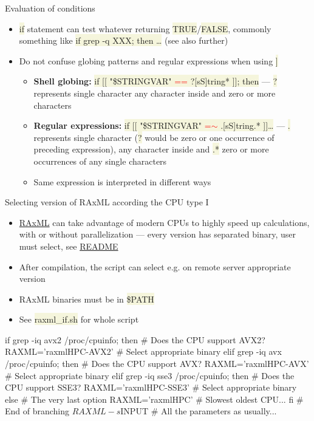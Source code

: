 \documentclass[compress, xelatex, 11pt, xcolor=svgnames, aspectratio=169,
	hyperref={
		bookmarks=true,
		unicode=true,
		colorlinks=true,
		pdftitle={Linux, command line and MetaCentrum},
		plainpages=false,
		pdfauthor={Vojtech Zeisek},
		pdfsubject={Course about use of Linux command line, writing shell scripts and using MetaCentrum of CESNET},
		pdfcreator={XeLaTeX},
		pdfkeywords={Linux, GNU, BASH, shell, command line, MetaCentrum},
		linkcolor=DarkRed, %
		anchorcolor=DarkBlue, %
		citecolor=Indigo, %
		filecolor=NavyBlue, %
		menucolor=DarkMagenta, %
		urlcolor=DarkBlue, %
		},
	url={hyphens, lowtilde} %
	]{beamer}
\renewcommand{\texttt}[1]{\colorbox{Beige}{{\ttfamily #1}}}
\renewcommand{\alert}[1]{\textcolor{red}{#1}}
\begin{document}
\begin{frame}[allowframebreaks]{Evaluation of conditions}
\begin{itemize}
		\item \texttt{if} statement can test whatever returning \texttt{TRUE}/\texttt{FALSE}, commonly something like \texttt{if grep -q XXX; then \ldots} (see also further)
		\item Do not confuse globing patterns and regular expressions when using \texttt{[[~\ldots~]]}
		\begin{itemize}
			\item \textbf{Shell globing:} \texttt{if [[ "\$\textbraceleft STRINGVAR\textbraceright " \alert{==} ?[sS]tring* ]]; then} --- \texttt{?} represents single character \texttt{[]} any character inside and \texttt{*} zero or more characters
			\item \textbf{Regular expressions:} \texttt{if [[ "\$\textbraceleft STRINGVAR\textbraceright " \alert{=$\sim$} .[sS]tring.* ]]\ldots} --- \texttt{.} represents single character (\texttt{?} would be zero or one occurrence of preceding expression), \texttt{[]} any character inside and \texttt{.*} zero or more occurrences of any single characters
			\item Same expression is interpreted in different ways
		\end{itemize}
	\end{itemize}
\end{frame}

\begin{frame}[fragile]{Selecting version of RAxML according the CPU type I} %
	\begin{itemize}
		\item \href{https://github.com/stamatak/standard-RAxML}{RAxML} can take advantage of modern CPUs to highly speed up calculations, with or without parallelization --- every version has separated binary, user must select, see \href{https://github.com/stamatak/standard-RAxML/blob/master/README.md}{README}
		\item After compilation, the script can select e.g. on remote server appropriate version
		\item RAxML binaries must be in \texttt{\$PATH}
		\item See \texttt{raxml\_if.sh} for whole script
	\end{itemize}
	\vfill
	\begin{bashcode}
    if grep -iq avx2 /proc/cpuinfo; then # Does the CPU support AVX2?
      RAXML='raxmlHPC-AVX2' # Select appropriate binary
      elif grep -iq avx /proc/cpuinfo; then # Does the CPU support AVX?
        RAXML='raxmlHPC-AVX' # Select appropriate binary
        elif grep -iq sse3 /proc/cpuinfo; then # Does the CPU support SSE3?
          RAXML='raxmlHPC-SSE3' # Select appropriate binary
          else # The very last option
            RAXML='raxmlHPC' # Slowest oldest CPU...
      fi # End of branching
    ${RAXML} -s ${INPUT} # All the parameters as usually...
	\end{bashcode}
\end{frame}
\end{document}
